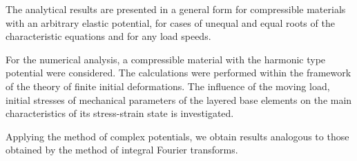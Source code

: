 The analytical results are presented in a general form for compressible materials with an arbitrary elastic potential, for cases of unequal and equal roots of the characteristic equations and for any load speeds.

For the numerical analysis, a compressible material with the harmonic type potential were considered. The calculations were performed within the framework of the theory of finite initial deformations. The influence of the moving load, initial stresses of mechanical parameters of the layered base elements on the main characteristics of its stress-strain state is investigated.

Applying the method of complex potentials, we obtain results analogous to those obtained by the method of integral Fourier transforms.









